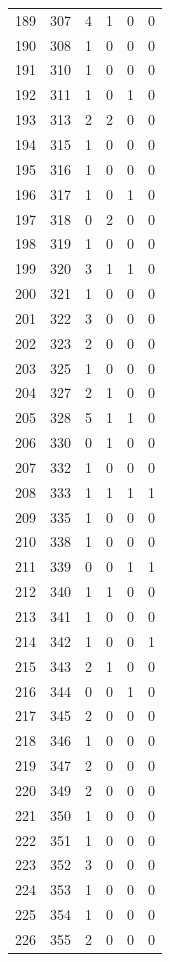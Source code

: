 \documentclass[
  letterpaper,
  DIV=11,
  numbers=noendperiod]{scrreprt}
\begin{document}
\begin{longtable}[]{@{}rrrrrr@{}}
189 & 307 & 4 & 1 & 0 & 0 \\
190 & 308 & 1 & 0 & 0 & 0 \\
191 & 310 & 1 & 0 & 0 & 0 \\
192 & 311 & 1 & 0 & 1 & 0 \\
193 & 313 & 2 & 2 & 0 & 0 \\
194 & 315 & 1 & 0 & 0 & 0 \\
195 & 316 & 1 & 0 & 0 & 0 \\
196 & 317 & 1 & 0 & 1 & 0 \\
197 & 318 & 0 & 2 & 0 & 0 \\
198 & 319 & 1 & 0 & 0 & 0 \\
199 & 320 & 3 & 1 & 1 & 0 \\
200 & 321 & 1 & 0 & 0 & 0 \\
201 & 322 & 3 & 0 & 0 & 0 \\
202 & 323 & 2 & 0 & 0 & 0 \\
203 & 325 & 1 & 0 & 0 & 0 \\
204 & 327 & 2 & 1 & 0 & 0 \\
205 & 328 & 5 & 1 & 1 & 0 \\
206 & 330 & 0 & 1 & 0 & 0 \\
207 & 332 & 1 & 0 & 0 & 0 \\
208 & 333 & 1 & 1 & 1 & 1 \\
209 & 335 & 1 & 0 & 0 & 0 \\
210 & 338 & 1 & 0 & 0 & 0 \\
211 & 339 & 0 & 0 & 1 & 1 \\
212 & 340 & 1 & 1 & 0 & 0 \\
213 & 341 & 1 & 0 & 0 & 0 \\
214 & 342 & 1 & 0 & 0 & 1 \\
215 & 343 & 2 & 1 & 0 & 0 \\
216 & 344 & 0 & 0 & 1 & 0 \\
217 & 345 & 2 & 0 & 0 & 0 \\
218 & 346 & 1 & 0 & 0 & 0 \\
219 & 347 & 2 & 0 & 0 & 0 \\
220 & 349 & 2 & 0 & 0 & 0 \\
221 & 350 & 1 & 0 & 0 & 0 \\
222 & 351 & 1 & 0 & 0 & 0 \\
223 & 352 & 3 & 0 & 0 & 0 \\
224 & 353 & 1 & 0 & 0 & 0 \\
225 & 354 & 1 & 0 & 0 & 0 \\
226 & 355 & 2 & 0 & 0 & 0 \\

\end{longtable}
\end{document}
